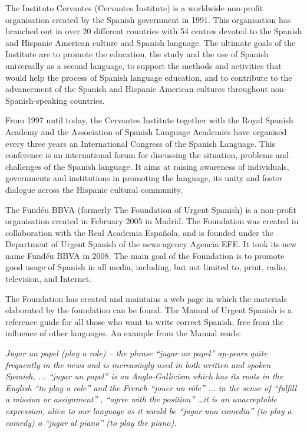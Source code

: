 \begin{multicols}{2}
The Instituto Cervantes (Cervantes Institute) is a worldwide non-profit organisation created by the Spanish government in 1991. This organisation has branched out in over 20 different countries with 54 centres devoted to the Spanish and Hispanic American culture and Spanish language. The ultimate goals of the Institute are to promote the education, the study and the use of Spanish universally as a second language, to support the methods and activities that would help the process of Spanish language education, and to contribute to the advancement of the Spanish and Hispanic American cultures throughout non-Spanish-speaking countries.

From 1997 until today, the Cervantes Institute together with the Royal Spanish Academy and the Association of Spanish Language Academies have organised every three years an International Congress of the Spanish Language. This conference is an international forum for discussing the situation, problems and challenges of the Spanish language. It aims at raising awareness of individuals, governments and institutions in promoting the language, its unity and foster dialogue across the Hispanic cultural community.


The Fundéu BBVA (formerly The Foundation of Urgent Spanish) \cite{fundeu} is a non-profit organisation created in February 2005 in Madrid. The Foundation was created in collaboration with the Real Academia Española, and is founded under the Department of Urgent Spanish of the news agency Agencia EFE. It took its new name Fundéu BBVA in 2008. The main goal of the Foundation is to promote good usage of Spanish in all media, including, but not limited to, print, radio, television, and Internet.

The Foundation has created and maintains a web page in which the materials elaborated by the foundation can be found. The Manual of Urgent Spanish is a reference guide for all those who want to write correct Spanish, free from the influence of other languages. An example from the Manual reads:

\textit{Jugar un papel (play a role) -- the phrase “jugar un papel” ap-pears quite frequently in the news and is increasingly used in both written and spoken Spanish,  ... “jugar un papel” is an Anglo-Gallicism which has its roots in the English "`to play a role"' and the French "`jouer un rôle"' ... in the sense of "`fulfill a mission or assignment"' , "`agree with the position"' \ldots it is an unacceptable expression, alien to our language as it would be “jugar una comedia” (to play a comedy) o “jugar al piano” (to play the piano).}


\end{multicols}

